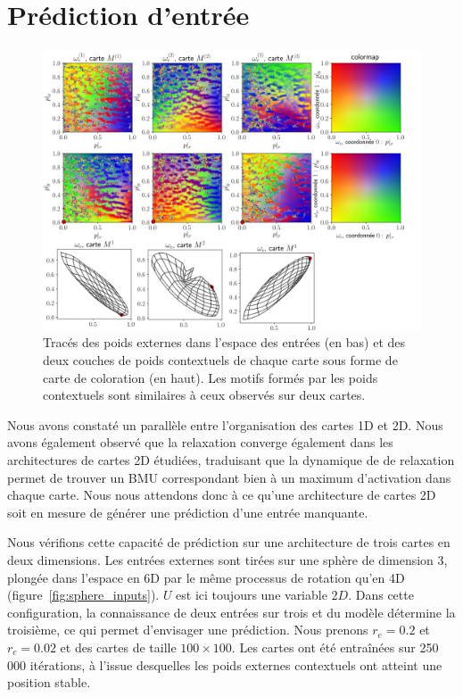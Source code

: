 \documentclass[../main]{subfiles}
\begin{document}
\section{Prédiction d'entrée \label{par:pred2D}}

\begin{figure}
	\includegraphics[width=\textwidth]{3SOM_S_wc_239999.png}
	\caption{Tracés des poids externes dans l'espace des entrées (en bas) et des deux couches de poids contextuels de chaque carte sous forme de carte de coloration (en haut). Les motifs formés par les poids contextuels sont similaires à ceux observés sur deux cartes. \label{fig:3som_w}}
\end{figure}

Nous avons constaté un parallèle entre l'organisation des cartes 1D et 2D. Nous avons également observé que la relaxation converge également dans les architectures de cartes 2D étudiées, traduisant que la dynamique de de relaxation permet de trouver un BMU correspondant bien à un maximum d'activation dans chaque carte.
Nous nous attendons donc à ce qu'une architecture de cartes 2D soit en mesure de générer une prédiction d'une entrée manquante.

Nous vérifions cette capacité de prédiction sur une architecture de trois cartes en deux dimensions. 
Les entrées externes sont tirées sur une sphère de dimension 3, plongée dans l'espace en 6D par le même processus de rotation qu'en 4D (figure~\ref{fig:sphere_inputs}). $U$ est ici toujours une variable $2D$. 
Dans cette configuration, la connaissance de deux entrées sur trois et du modèle détermine la troisième, ce qui permet d'envisager une prédiction.
Nous prenons $r_e = 0.2$ et $r_c = 0.02$ et des cartes de taille $100 \times 100$. Les cartes ont été entraînées sur 250 000 itérations, à l'issue desquelles les poids externes contextuels ont atteint une position stable.
\end{document}
